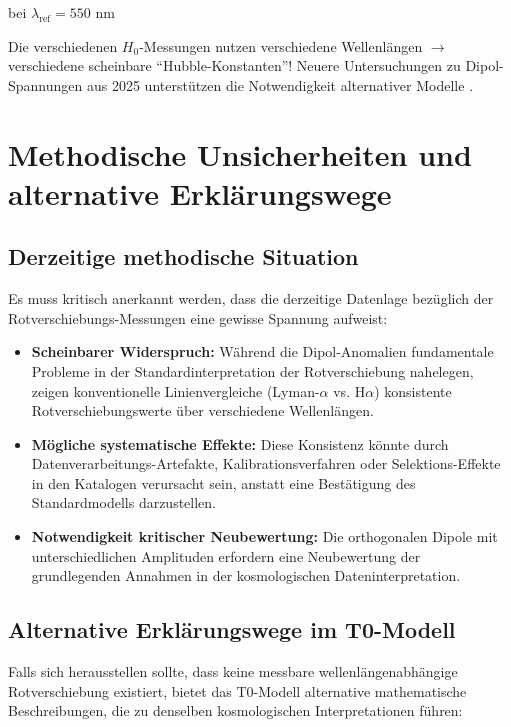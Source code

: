 \documentclass{article}
\begin{document}
	bei $\lambda_{\text{ref}} = 550$ nm
	
	Die verschiedenen $H_0$-Messungen nutzen verschiedene Wellenlängen $\rightarrow$ verschiedene scheinbare ``Hubble-Konstanten''! Neuere Untersuchungen zu Dipol-Spannungen aus 2025 unterstützen die Notwendigkeit alternativer Modelle \cite{landstry2025, bengaly2025}.
	
	\section{Methodische Unsicherheiten und alternative Erklärungswege}
	
	\subsection{Derzeitige methodische Situation}
	
	Es muss kritisch anerkannt werden, dass die derzeitige Datenlage bezüglich der Rotverschiebungs-Messungen eine gewisse Spannung aufweist:
	
	\begin{itemize}
		\item \textbf{Scheinbarer Widerspruch:} Während die Dipol-Anomalien fundamentale Probleme in der Standardinterpretation der Rotverschiebung nahelegen, zeigen konventionelle Linienvergleiche (Lyman-$\alpha$ vs. H$\alpha$) konsistente Rotverschiebungswerte über verschiedene Wellenlängen.
		
		\item \textbf{Mögliche systematische Effekte:} Diese Konsistenz könnte durch Datenverarbeitungs-Artefakte, Kalibrationsverfahren oder Selektions-Effekte in den Katalogen verursacht sein, anstatt eine Bestätigung des Standardmodells darzustellen.
		
		\item \textbf{Notwendigkeit kritischer Neubewertung:} Die orthogonalen Dipole mit unterschiedlichen Amplituden erfordern eine Neubewertung der grundlegenden Annahmen in der kosmologischen Dateninterpretation.
	\end{itemize}
	
	\subsection{Alternative Erklärungswege im T0-Modell}
	
	Falls sich herausstellen sollte, dass keine messbare wellenlängenabhängige Rotverschiebung existiert, bietet das T0-Modell alternative mathematische Beschreibungen, die zu denselben kosmologischen Interpretationen führen:
	
\end{document}
